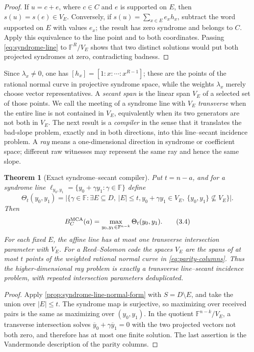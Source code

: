 \documentclass[12pt,a4paper]{amsart}
\numberwithin{equation}{section}
\newtheorem{theorem}{Theorem}[section]
\theoremstyle{remark}
\newcommand{\F}{\mathbb F}
\newcommand{\abs}[1]{\lvert #1\rvert}
\begin{document}
\begin{proof}
If \(u=c+e\), where \(c\in C\) and \(e\) is supported on \(E\), then
\(s(u)=s(e)\in V_E\).  Conversely, if
\(s(u)=\sum_{x\in E}e_xh_x\), subtract the word supported on \(E\) with
values \(e_x\); the result has zero syndrome and belongs to \(C\).  Apply
this equivalence to the line point and to both coordinates.  Passing
\eqref{eq:syndrome-line} to \(\F^R/V_E\) shows that two distinct solutions
would put both projected syndromes at zero, contradicting badness.
\end{proof}

Since \(\lambda_x\ne0\), one has
\([h_x]=[1:x:\cdots:x^{R-1}]\); these are the points of the rational
normal curve in projective syndrome space, while the weights
\(\lambda_x\) merely choose vector representatives.  A \emph{secant span} is the linear span
\(V_E\) of a selected set of those points.  We call the meeting of a
syndrome line with \(V_E\) \emph{transverse} when the entire line is not
contained in \(V_E\), equivalently when its two generators are not both in
\(V_E\).  The next result is a \emph{compiler} in the sense that it
translates the bad-slope problem, exactly and in both directions, into this
line--secant incidence problem.  A \emph{ray} means a one-dimensional
direction in syndrome or coefficient space; different raw witnesses may
represent the same ray and hence the same slope.

\begin{theorem}[Exact syndrome--secant compiler]
\label{thm:syndrome-secant-exact}
Put \(t=n-a\), and for a syndrome line
\(\ell_{y_0,y_1}=\{y_0+\gamma y_1:\gamma\in\F\}\) define
\[
 \Theta_t(y_0,y_1)=
 \abs{\{\gamma\in\F:\exists E\subseteq D,\ \abs E\le t,
 y_0+\gamma y_1\in V_E,
 \ \{y_0,y_1\}\not\subseteq V_E\}}.
 \tag{3.3}\label{eq:transverse-secant-count}
\]
Then
\[
 B_C^{\rm MCA}(a)=\max_{y_0,y_1\in\F^{n-k}}
                    \Theta_t(y_0,y_1).
 \tag{3.4}\label{eq:exact-secant-numerator}
\]
For each fixed \(E\), the affine line has at most one transverse
intersection parameter with \(V_E\).  For a Reed--Solomon code the
spaces \(V_E\) are the spans of at most \(t\) points of the weighted
rational normal curve in \eqref{eq:parity-columns}.  Thus the
higher-dimensional ray problem is exactly a transverse line--secant
incidence problem, with repeated intersection parameters deduplicated.
\end{theorem}

\begin{proof}
Apply \cref{prop:syndrome-line-normal-form} with \(S=D\setminus E\), and
take the union over \(\abs E\le t\).  The syndrome map is surjective, so
maximizing over received pairs is the same as maximizing over
\((y_0,y_1)\).  In the quotient \(\F^{n-k}/V_E\), a transverse
intersection solves
\(\overline y_0+\gamma\overline y_1=0\) with the two projected vectors
not both zero, and therefore has at most one finite solution.  The last
assertion is the Vandermonde description of the parity columns.
\end{proof}
\end{document}
